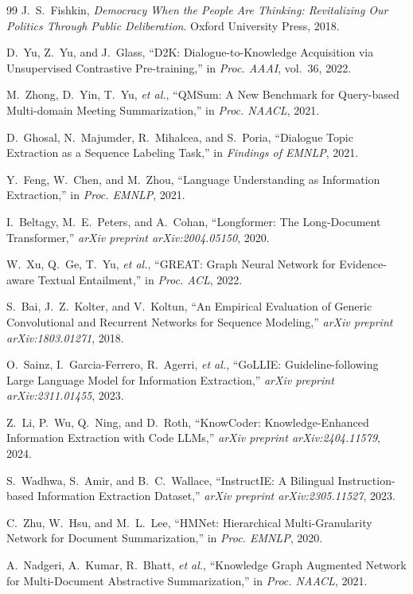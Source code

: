 \documentclass[conference]{IEEEtran}
\begin{document}
\begin{thebibliography}{99}
J.~S.~Fishkin,
\emph{Democracy When the People Are Thinking: Revitalizing Our Politics Through Public Deliberation}.
Oxford University Press, 2018.

D.~Yu, Z.~Yu, and J.~Glass,
``D2K: Dialogue-to-Knowledge Acquisition via Unsupervised Contrastive Pre-training,''
in \emph{Proc. AAAI}, vol.~36, 2022.

M.~Zhong, D.~Yin, T.~Yu, \emph{et al.},
``QMSum: A New Benchmark for Query-based Multi-domain Meeting Summarization,''
in \emph{Proc. NAACL}, 2021.

D.~Ghosal, N.~Majumder, R.~Mihalcea, and S.~Poria,
``Dialogue Topic Extraction as a Sequence Labeling Task,''
in \emph{Findings of EMNLP}, 2021.

Y.~Feng, W.~Chen, and M.~Zhou,
``Language Understanding as Information Extraction,''
in \emph{Proc. EMNLP}, 2021.

I.~Beltagy, M.~E.~Peters, and A.~Cohan,
``Longformer: The Long-Document Transformer,''
\emph{arXiv preprint arXiv:2004.05150}, 2020.

W.~Xu, Q.~Ge, T.~Yu, \emph{et al.},
``GREAT: Graph Neural Network for Evidence-aware Textual Entailment,''
in \emph{Proc. ACL}, 2022.

S.~Bai, J.~Z.~Kolter, and V.~Koltun,
``An Empirical Evaluation of Generic Convolutional and Recurrent Networks for Sequence Modeling,''
\emph{arXiv preprint arXiv:1803.01271}, 2018.

O.~Sainz, I.~Garcia-Ferrero, R.~Agerri, \emph{et al.},
``GoLLIE: Guideline-following Large Language Model for Information Extraction,''
\emph{arXiv preprint arXiv:2311.01455}, 2023.

Z.~Li, P.~Wu, Q.~Ning, and D.~Roth,
``KnowCoder: Knowledge-Enhanced Information Extraction with Code LLMs,''
\emph{arXiv preprint arXiv:2404.11579}, 2024.

S.~Wadhwa, S.~Amir, and B.~C.~Wallace,
``InstructIE: A Bilingual Instruction-based Information Extraction Dataset,''
\emph{arXiv preprint arXiv:2305.11527}, 2023.

C.~Zhu, W.~Hsu, and M.~L.~Lee,
``HMNet: Hierarchical Multi-Granularity Network for Document Summarization,''
in \emph{Proc. EMNLP}, 2020.

A.~Nadgeri, A.~Kumar, R.~Bhatt, \emph{et al.},
``Knowledge Graph Augmented Network for Multi-Document Abstractive Summarization,''
in \emph{Proc. NAACL}, 2021.


\end{thebibliography}
\end{document}
